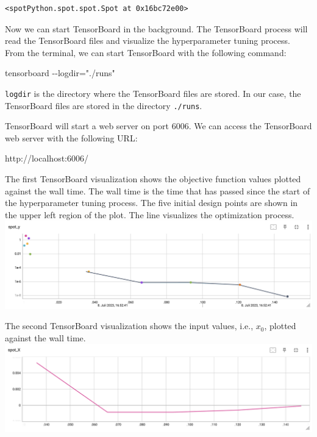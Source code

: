 \documentclass[
  letterpaper,
  DIV=11,
  numbers=noendperiod]{scrreprt}
\newenvironment{Shaded}{\begin{snugshade}}{\end{snugshade}}
\newcommand{\NormalTok}[1]{\textcolor[rgb]{0.00,0.23,0.31}{#1}}
\begin{document}
\begin{verbatim}
<spotPython.spot.spot.Spot at 0x16bc72e00>
\end{verbatim}

Now we can start TensorBoard in the background. The TensorBoard process
will read the TensorBoard files and visualize the hyperparameter tuning
process. From the terminal, we can start TensorBoard with the following
command:

\begin{Shaded}
\begin{Highlighting}[]
\NormalTok{tensorboard {-}{-}logdir="./runs"}
\end{Highlighting}
\end{Shaded}

\texttt{logdir} is the directory where the TensorBoard files are stored.
In our case, the TensorBoard files are stored in the directory
\texttt{./runs}.

TensorBoard will start a web server on port 6006. We can access the
TensorBoard web server with the following URL:

\begin{Shaded}
\begin{Highlighting}[]
\NormalTok{http://localhost:6006/}
\end{Highlighting}
\end{Shaded}

The first TensorBoard visualization shows the objective function values
plotted against the wall time. The wall time is the time that has passed
since the start of the hyperparameter tuning process. The five initial
design points are shown in the upper left region of the plot. The line
visualizes the optimization process.
\includegraphics{figures_static/01_tensorboard_01.png}

The second TensorBoard visualization shows the input values, i.e.,
\(x_0\), plotted against the wall time.
\includegraphics{figures_static/01_tensorboard_02.png}
\end{document}
